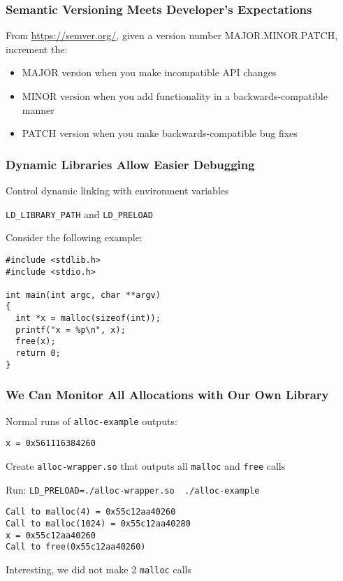   \begin{frame}
    \frametitle{Semantic Versioning Meets Developer's Expectations}

    From \url{https://semver.org/}, given a version number MAJOR.MINOR.PATCH,
    increment the:

    \begin{itemize}
      \item MAJOR version when you make incompatible API changes
      \item MINOR version when you add functionality in a backwards-compatible
            manner
      \item PATCH version when you make backwards-compatible bug fixes
    \end{itemize}
  \end{frame}

  \begin{frame}[fragile]
    \frametitle{Dynamic Libraries Allow Easier Debugging}

    Control dynamic linking with environment variables

    \hspace{2em} \texttt{LD\_LIBRARY\_PATH} and \texttt{LD\_PRELOAD}

    \vspace{2em}

    Consider the following example:
    \begin{lstlisting}[xleftmargin=2em]
#include <stdlib.h>
#include <stdio.h>

int main(int argc, char **argv)
{
  int *x = malloc(sizeof(int));
  printf("x = %p\n", x);
  free(x);
  return 0;
}
    \end{lstlisting}
  \end{frame}

  \begin{frame}[fragile]
    \frametitle{We Can Monitor All Allocations with Our Own Library}

    Normal runs of \texttt{alloc-example} outputs:
    \begin{lstlisting}
x = 0x561116384260
    \end{lstlisting}

    \vspace{1em}

    Create \texttt{alloc-wrapper.so} that outputs all \texttt{malloc} and
    \texttt{free} calls

    \vspace{1em}

    Run: \lstinline|LD_PRELOAD=./alloc-wrapper.so  ./alloc-example|

    \begin{lstlisting}[xleftmargin=2em]
Call to malloc(4) = 0x55c12aa40260                  
Call to malloc(1024) = 0x55c12aa40280
x = 0x55c12aa40260
Call to free(0x55c12aa40260)
    \end{lstlisting}

    \vspace{1em}

    Interesting, we did not make 2 \texttt{malloc} calls
  \end{frame}

